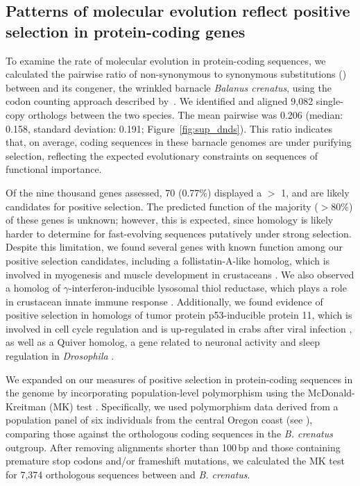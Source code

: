 \subsection*{Patterns of molecular evolution reflect positive selection in protein-coding genes}

To examine the rate of molecular evolution in protein-coding sequences, we calculated
the pairwise ratio of non-synonymous to synonymous substitutions (\dnds) between
\bgla{} and its congener, the wrinkled barnacle \textit{Balanus crenatus},
using the codon counting approach described by~\citet{nei1986_dnds}.
We identified and aligned 9{,}082 single-copy orthologs between the two species.
The mean pairwise \dnds{} was 0.206 (median: 0.158, standard deviation: 0.191;
Figure~\ref{fig:sup_dnds}). This ratio indicates that, on average, coding
sequences in these barnacle genomes are under purifying selection, reflecting the
expected evolutionary constraints on sequences of functional importance.
\vspace{0.1cm}

Of the nine thousand genes assessed, 70 (0.77\%) displayed a \dnds{} $>$ 1, and are
likely candidates for positive selection.
The predicted function of the majority ($>80\%$) of these genes is unknown; however,
this is expected, since homology is likely harder to determine for fast-evolving
sequences putatively under strong selection.
Despite this limitation, we found several genes with known function among our positive
selection candidates, including a follistatin-A-like homolog, which is involved
in myogenesis and muscle development in crustaceans \citep{yan_identification_2021}.
We also observed a homolog of $\gamma$-interferon-inducible lysosomal thiol reductase,
which plays a role in crustacean innate immune response \citep{liu_involvement_2019}.
Additionally, we found evidence of positive selection in homologs of tumor protein
p53-inducible protein 11, which is involved in cell cycle regulation and is up-regulated
in crabs after viral infection \citep{cheng_p53_2021}, as well as a Quiver homolog, a
gene related to neuronal activity and sleep regulation in \textit{Drosophila}
\citep{wang_quiver_2010}.
\vspace{0.1cm}

We expanded on our \dnds{} measures of positive selection in protein-coding sequences
in the \bgla{} genome by incorporating population-level polymorphism using the
McDonald-Kreitman (MK) test \citep{mcdonald_adaptive_1991}.
Specifically, we used polymorphism data derived from a population panel of six \bgla{}
individuals from the central Oregon coast (see ), comparing
those against the orthologous coding sequences in the \textit{B. crenatus} outgroup.
After removing alignments shorter than 100\,bp and those containing premature stop
codons and/or frameshift mutations, we calculated the MK test for 7{,}374 orthologous
sequences between \bgla{} and \textit{B. crenatus}.
\vspace{0.1cm}

